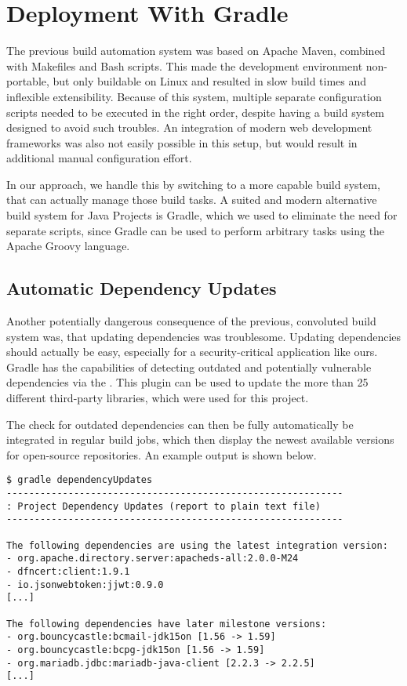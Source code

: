 \section{Deployment With Gradle}\label{sec:deploymentWithGradle}
The previous build automation system was based on Apache Maven, combined with Makefiles and Bash scripts.
This made the development environment non-portable, but only buildable on Linux and resulted in slow build times and
inflexible extensibility.
Because of this system, multiple separate configuration scripts needed to be executed in the right order, despite having
a build system designed to avoid such troubles.
An integration of modern web development frameworks was also not easily possible in this setup, but would result in
additional manual configuration effort.

In our approach, we handle this by switching to a more capable build system, that can actually manage those build tasks.
A suited and modern alternative build system for Java Projects is Gradle, which we used to eliminate the need for
separate scripts, since Gradle can be used to perform arbitrary tasks using the Apache Groovy language.

\subsection*{Automatic Dependency Updates}
Another potentially dangerous consequence of the previous, convoluted build system was, that updating dependencies was
troublesome.
Updating dependencies should actually be easy, especially for a security-critical application like ours.
Gradle has the capabilities of detecting outdated and potentially vulnerable dependencies via the
.
This plugin can be used to update the more than 25 different third-party libraries, which were used for this project.

The check for outdated dependencies can then be fully automatically be integrated in regular build jobs, which then
display the newest available versions for open-source repositories.
An example output is shown below.

\begin{lstlisting}
$ gradle dependencyUpdates
------------------------------------------------------------
: Project Dependency Updates (report to plain text file)
------------------------------------------------------------

The following dependencies are using the latest integration version:
- org.apache.directory.server:apacheds-all:2.0.0-M24
- dfncert:client:1.9.1
- io.jsonwebtoken:jjwt:0.9.0
[...]

The following dependencies have later milestone versions:
- org.bouncycastle:bcmail-jdk15on [1.56 -> 1.59]
- org.bouncycastle:bcpg-jdk15on [1.56 -> 1.59]
- org.mariadb.jdbc:mariadb-java-client [2.2.3 -> 2.2.5]
[...]
\end{lstlisting}

